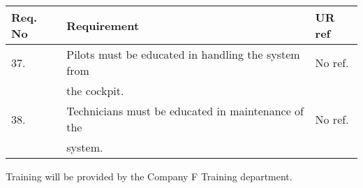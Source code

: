 \begin{center}
    \begin{tabular}{ | l | p{9cm} | l |}
    \hline
    Req. No & Requirement  & UR ref \\ \hline
    37. & Pilots must be educated in handling the system from & No ref.\\&the cockpit.  & \\ \hline
    38. & Technicians must be educated in maintenance of the& No ref.\\ &system.  &\\ \hline
    \end{tabular}
\end{center}

Training will be provided by the Company F Training department.